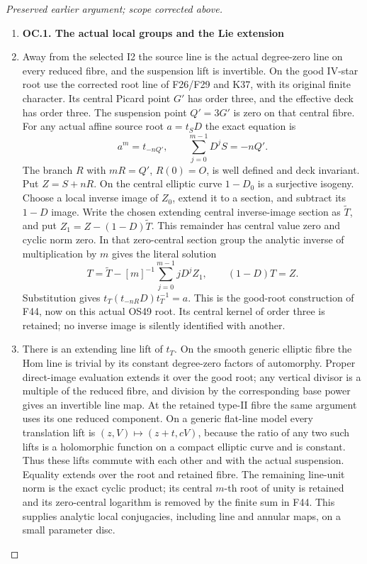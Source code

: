 \begin{proof}[Preserved earlier argument; scope corrected above]
\begin{enumerate}[label=\arabic*.]
\item \par

\medskip\noindent\textbf{OC.1. The actual local groups and the Lie extension}

\par\nobreak

\item Away from the selected I2 the source line is the actual degree-zero
line on every reduced fibre, and the suspension lift is invertible.
On the good IV-star root use the corrected root line of F26/F29 and
K37, with its original finite character. Its central Picard point
\(G'\) has order three, and the effective deck has order three.
The suspension point \(Q'=3G'\) is zero on that central fibre.
For any actual affine source root \(a=t_S D\) the exact equation is
\[
       a^m=t_{-nQ'},\qquad
       \sum_{j=0}^{m-1}D^jS=-nQ'.                         \tag{OC.1}
\]
The branch \(R\) with \(mR=Q'\), \(R(0)=O\), is
well defined and deck invariant. Put \(Z=S+nR\). On the central
elliptic curve \(1-D_0\) is a surjective isogeny. Choose a local
inverse image of \(Z_0\), extend it to a section, and subtract
its \(1-D\) image. Write the chosen extending central inverse-image section as
\(\widetilde T\), and put
\(Z_1=Z-(1-D)\widetilde T\). This remainder has central value zero
and cyclic norm zero. In that zero-central section group the analytic
inverse of multiplication by \(m\) gives the literal solution
\[
 T=\widetilde T-[m]^{-1}\sum_{j=0}^{m-1}jD^jZ_1,
                 \qquad (1-D)T=Z.                        \tag{OC.2}
\] Substitution
gives \(t_T(t_{-nR}D)t_T^{-1}=a\). This is the good-root
construction of F44, now on this actual OS49 root. Its central kernel
of order three is retained; no inverse image is silently identified
with another.

\item There is an extending line lift of \(t_T\). On the smooth
generic elliptic fibre the Hom line is trivial by its constant
degree-zero factors of automorphy. Proper direct-image evaluation
extends it over the good root; any vertical divisor is a multiple of
the reduced fibre, and division by the corresponding base power gives
an invertible line map. At the retained type-II fibre the same
argument uses its one reduced component. On a generic flat-line
model every translation lift is \((z,V)\mapsto(z+t,cV)\),
because the ratio of any two such lifts is a holomorphic function on
a compact elliptic curve and is constant. Thus these lifts commute
with each other and with the actual suspension. Equality extends
over the root and retained fibre. The remaining line-unit norm is
the exact cyclic product; its central \(m\)-th root of unity is
retained and its zero-central logarithm is removed by the finite sum
in F44. This supplies analytic local conjugacies, including line and
annular maps, on a small parameter disc.


\end{enumerate}
\end{proof}
